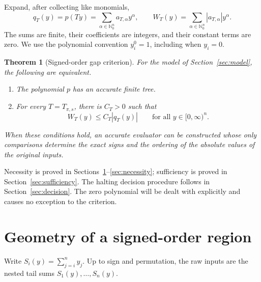 \documentclass[11pt,a4paper]{article}
\numberwithin{equation}{section}
\newtheorem{theorem}{Theorem}[section]
\theoremstyle{definition}
\theoremstyle{remark}
\newcommand{\NN}{\mathbb N_0}
\newcommand{\abs}[1]{\left|#1\right|}
\begin{document}
Expand, after collecting like monomials,
\begin{equation}\label{eq:qW}
 q_T(y)=p(Ty)=\sum_{\alpha\in\NN^n}a_{T,\alpha}y^\alpha,
 \qquad
 W_T(y)=\sum_{\alpha\in\NN^n}\abs{a_{T,\alpha}}y^\alpha.
\end{equation}
The sums are finite, their coefficients are integers, and their constant
terms are zero.  We use the polynomial convention $y_i^0=1$, including
when $y_i=0$.

\begin{theorem}[Signed-order gap criterion]\label{thm:main}
For the model of Section~\ref{sec:model}, the following are equivalent.
\begin{enumerate}[label=\textup{(\roman*)}]
\item\label{item:accurate} The polynomial $p$ has an accurate finite tree.
\item\label{item:dominated} For every $T=T_{\pi,s}$, there is $C_T>0$ such that
\begin{equation}\label{eq:criterion}
 W_T(y)\le C_T\abs{q_T(y)}\qquad\text{for all }y\in[0,\infty)^n.
\end{equation}
\end{enumerate}
When these conditions hold, an accurate evaluator can be constructed whose
only comparisons determine the exact signs and the ordering of the
absolute values of the original inputs.
\end{theorem}

Necessity is proved in Sections~\ref{sec:geometry}--\ref{sec:necessity};
sufficiency is proved in Section~\ref{sec:sufficiency}.  The halting
decision procedure follows in Section~\ref{sec:decision}.
The zero polynomial will be dealt with explicitly and causes no exception
to the criterion.

\section{Geometry of a signed-order region}\label{sec:geometry}

Write $S_i(y)=\sum_{j=i}^n y_j$.  Up to sign and permutation, the raw
inputs are the nested tail sums $S_1(y),\ldots,S_n(y)$.
\end{document}
